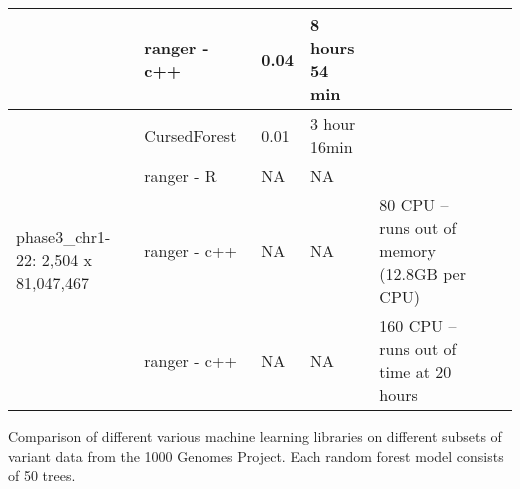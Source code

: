 \documentclass[11pt]{article}
\newcommand{\cursedforest}{{\sc CursedForest}}
\begin{document}
\begin{sidewaystable}[!ht]
\begin{minipage}{\textwidth}
\begin{tabular}{|l|l|l|l|l|l|p{1cm}|}
						& ranger - c++ & 0.04 & 8 hours 54 min &  \\
\hline
\multirow{4}{*}{phase3\_chr1-22: 2,504 x 81,047,467} & \cursedforest\ & 0.01  & 3 hour 16min & \\%
										& ranger - R       &        NA     &        NA   & \\
										& ranger - c++       &        NA     &        NA     &            80 CPU -- runs out of memory (12.8GB per CPU) \\
										& ranger - c++       &        NA     &        NA     &            160 CPU -- runs out of time at 20 hours \\
\hline
\end{tabular}
\begin{flushleft} 
Comparison of different various machine learning libraries on different subsets of variant data 
from the 1000 Genomes Project.
Each random forest model consists of 50 trees.
\end{flushleft}
\label{table1}
\end{minipage}
\end{sidewaystable}








%

\end{document}
